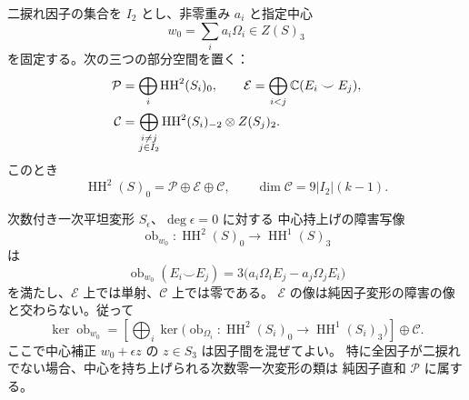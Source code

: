 \begin{proposition}[次数零混合類の中心障害とその核]
\label{ifh:prop:central-mixed-obstruction}
二捩れ因子の集合を $I_2$ とし、非零重み $a_i$ と指定中心
\[
                    w_0=\sum_i a_i\Omega_i\in Z(S)_3
\]
を固定する。次の三つの部分空間を置く：
\[
 \begin{aligned}
 \mathcal P&=\bigoplus_i\operatorname{HH}^2(S_i)_0,\qquad
 \mathcal E=\bigoplus_{i<j}\mathbb C(E_i\smile E_j),\\
 \mathcal C&=\bigoplus_{\substack{i\ne j\\j\in I_2}}
                  \operatorname{HH}^2(S_i)_{-2}\otimes Z(S_j)_2.
 \end{aligned}
\]
このとき
\begin{equation}\label{ifh:eq:degree-zero}
 \operatorname{HH}^2(S)_0=\mathcal P\oplus\mathcal E\oplus\mathcal C,
           \qquad \dim\mathcal C=9|I_2|(k-1).
\end{equation}

次数付き一次平坦変形 $S_\epsilon$、$\deg\epsilon=0$ に対する
中心持上げの障害写像
\[
 \operatorname{ob}_{w_0}:
      \operatorname{HH}^2(S)_0\longrightarrow\operatorname{HH}^1(S)_3
\]
は
\begin{equation}\label{ifh:eq:mixed-obstruction}
 \operatorname{ob}_{w_0}(E_i\smile E_j)
       =3\bigl(a_i\Omega_iE_j-a_j\Omega_jE_i\bigr)
\end{equation}
を満たし、$\mathcal E$ 上では単射、$\mathcal C$ 上では零である。
$\mathcal E$ の像は純因子変形の障害の像と交わらない。従って
\begin{equation}\label{ifh:eq:obstruction-kernel}
 \ker\operatorname{ob}_{w_0}
   =\left[\bigoplus_i
       \ker\bigl(\operatorname{ob}_{\Omega_i}:
             \operatorname{HH}^2(S_i)_0
                \longrightarrow\operatorname{HH}^1(S_i)_3\bigr)\right]
       \oplus\mathcal C.
\end{equation}
ここで中心補正 $w_0+\epsilon z$ の $z\in S_3$ は因子間を混ぜてよい。
特に全因子が二捩れでない場合、中心を持ち上げられる次数零一次変形の類は
純因子直和 $\mathcal P$ に属する。
\end{proposition}

